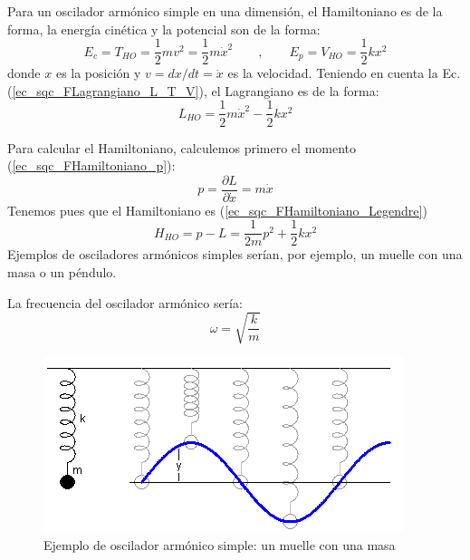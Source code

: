    Para un oscilador armónico simple en una dimensión, el Hamiltoniano es de la forma, la energía cinética y la potencial son de la forma:
    \begin{equation} \label{ec_sqc_oscilador_T_V}
        E_c = T_{HO} = \frac{1}{2} m v^2 = \frac{1}{2} m \dot{x}^2 
        \qquad , \qquad
        E_p = V_{HO} = \frac{1}{2} k x^2
    \end{equation}
    donde $x$ es la posición y $v = dx/dt = \dot{x}$ es la velocidad. Teniendo en cuenta la Ec. 
    (\ref{ec_sqc_FLagrangiano_L_T_V}), el Lagrangiano es de la forma:
    \begin{equation} \label{ec_sqc_oscilador_L}
        L_{HO} = \frac{1}{2} m \dot{x}^2 - \frac{1}{2} k x^2
    \end{equation}

    Para calcular el Hamiltoniano, calculemos primero el momento (\ref{ec_sqc_FHamiltoniano_p}):
    \begin{equation} \label{ec_sqc_oscialdor_p}
        p = \frac{\partial L}{\partial \dot{x}} = m \dot{x}
    \end{equation}
    Tenemos pues que el Hamiltoniano es (\ref{ec_sqc_FHamiltoniano_Legendre})
    \begin{equation} \label{ec_sqc_oscilador_H}
        H_{HO} = p - L = \frac{1}{2m} p^2 + \frac{1}{2} k x^2  
    \end{equation}
    Ejemplos de osciladores armónicos simples serían, por ejemplo, un muelle con una masa o un péndulo.

    La frecuencia del oscilador armónico sería:
    \begin{equation} \label{ec_sqc_oscilador_omega}
        \omega = \sqrt{\frac{k}{m}}
    \end{equation}
    
    \begin{figure}[h]
        \centering 
        \includegraphics[width=0.5\linewidth]{Figuras/Fig_HarmOsc1.png}
        \caption{Ejemplo de oscilador armónico simple: un muelle con una masa}
        \label{Fig_HarmOsc1}
    \end{figure}

    




